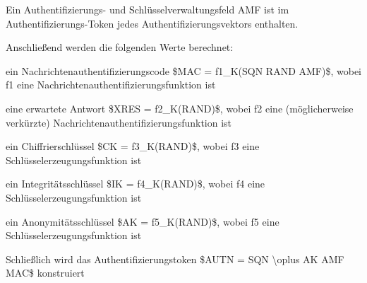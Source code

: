 \documentclass[a4paper]{article}
\begin{document}
\begin{multicols}{3}
\begin{itemize*}
\begin{itemize*}
                  \item Ein Authentifizierungs- und Schlüsselverwaltungsfeld AMF ist im Authentifizierungs-Token jedes Authentifizierungsvektors enthalten.
                  \item Anschließend werden die folgenden Werte berechnet:
                  \begin{itemize*} \item ein Nachrichtenauthentifizierungscode \$MAC = f1\_K(SQN \textbar\textbar{} RAND \textbar\textbar{} AMF)\$, wobei f1 eine Nachrichtenauthentifizierungsfunktion ist \item eine erwartete Antwort \$XRES = f2\_K(RAND)\$, wobei f2 eine (möglicherweise verkürzte) Nachrichtenauthentifizierungsfunktion ist \item ein Chiffrierschlüssel \$CK = f3\_K(RAND)\$, wobei f3 eine Schlüsselerzeugungsfunktion ist \item ein Integritätsschlüssel \$IK = f4\_K(RAND)\$, wobei f4 eine Schlüsselerzeugungsfunktion ist \item ein Anonymitätsschlüssel \$AK = f5\_K(RAND)\$, wobei f5 eine Schlüsselerzeugungsfunktion ist \end{itemize*}
                  \item Schließlich wird das Authentifizierungstoken \$AUTN = SQN \textbackslash oplus AK \textbar\textbar{} AMF \textbar\textbar{} MAC\$ konstruiert
            \end{itemize*}


\end{itemize*}
\end{multicols}
\end{document}
